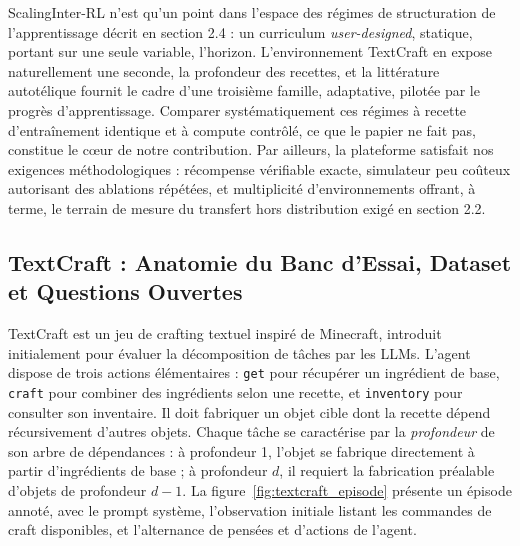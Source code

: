\documentclass[11pt,a4paper]{article}
\begin{document}
ScalingInter-RL n'est qu'un point dans l'espace des régimes de structuration de l'apprentissage décrit en section 2.4 : un curriculum \emph{user-designed}, statique, portant sur une seule variable, l'horizon. L'environnement TextCraft en expose naturellement une seconde, la profondeur des recettes, et la littérature autotélique fournit le cadre d'une troisième famille, adaptative, pilotée par le progrès d'apprentissage. Comparer systématiquement ces régimes à recette d'entraînement identique et à compute contrôlé, ce que le papier ne fait pas, constitue le cœur de notre contribution. Par ailleurs, la plateforme satisfait nos exigences méthodologiques : récompense vérifiable exacte, simulateur peu coûteux autorisant des ablations répétées, et multiplicité d'environnements offrant, à terme, le terrain de mesure du transfert hors distribution exigé en section 2.2.

\subsection{TextCraft : Anatomie du Banc d'Essai, Dataset et Questions Ouvertes}

TextCraft \cite{prasad2023adapt} est un jeu de crafting textuel inspiré de Minecraft, introduit initialement pour évaluer la décomposition de tâches par les LLMs. L'agent dispose de trois actions élémentaires : \texttt{get} pour récupérer un ingrédient de base, \texttt{craft} pour combiner des ingrédients selon une recette, et \texttt{inventory} pour consulter son inventaire. Il doit fabriquer un objet cible dont la recette dépend récursivement d'autres objets. Chaque tâche se caractérise par la \emph{profondeur} de son arbre de dépendances : à profondeur 1, l'objet se fabrique directement à partir d'ingrédients de base ; à profondeur $d$, il requiert la fabrication préalable d'objets de profondeur $d-1$. La figure~\ref{fig:textcraft_episode} présente un épisode annoté, avec le prompt système, l'observation initiale listant les commandes de craft disponibles, et l'alternance de pensées et d'actions de l'agent.
\end{document}
